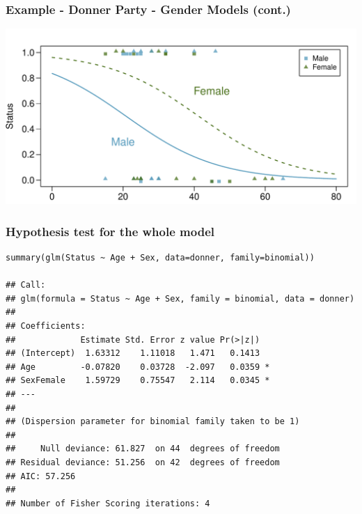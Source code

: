 
\begin{frame}
\frametitle{Example - Donner Party - Gender Models (cont.)}

\begin{center}
\includegraphics[width=\textwidth]{9-5_logistic_reg/figures/donner/donner_scatter_both.pdf}
\end{center}

\end{frame}



\begin{frame}
\frametitle{Hypothesis test for the whole model}
\vspace{-3mm}
{\scriptsize
\begin{verbatim}
summary(glm(Status ~ Age + Sex, data=donner, family=binomial))

## Call:
## glm(formula = Status ~ Age + Sex, family = binomial, data = donner)
## 
## Coefficients:
##             Estimate Std. Error z value Pr(>|z|)  
## (Intercept)  1.63312    1.11018   1.471   0.1413  
## Age         -0.07820    0.03728  -2.097   0.0359 *
## SexFemale    1.59729    0.75547   2.114   0.0345 *
## ---
## 
## (Dispersion parameter for binomial family taken to be 1)
## 
##     Null deviance: 61.827  on 44  degrees of freedom
## Residual deviance: 51.256  on 42  degrees of freedom
## AIC: 57.256
## 
## Number of Fisher Scoring iterations: 4
\end{verbatim}
}

\pause


\end{frame}

